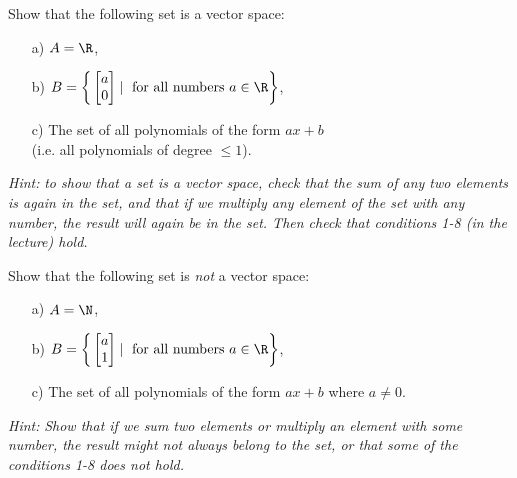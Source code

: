 \begin{problem}%
    Show that the following set is a vector space:

    \begin{enumerate}
        \item [a)] $A = \R$,
        
        \item [b)] $B = \bigg\{ \begin{bmatrix} a \\ 0 \end{bmatrix} \mid \text{ for all numbers }a\in\R\bigg\}$,

        \item [c)] The set of all polynomials of the form $ax+b$ \\(i.e. all polynomials of degree $\le 1$). 

    \end{enumerate}
    \bigskip
    {\small \textit{Hint:} \textit{to show that a set is a vector space, check that the sum of any two elements is again in the set, and that if we multiply any element of the set with any number, the result will again be in the set. Then check that conditions 1-8 (in the lecture) hold.}}
\end{problem}
\medskip
\begin{problem}%
    Show that the following set is \textit{not} a vector space:

    \begin{enumerate}
        \item [a)] $A = \N$,
        
        \item [b)] $B =  \bigg\{ \begin{bmatrix} a \\ 1 \end{bmatrix} \mid \text{ for all numbers }a\in\R\bigg\}$,
        
        \item [c)] The set of all polynomials of the form $ax+b$ where $a \ne 0$.

    \end{enumerate}
    \bigskip
    {\small \textit{Hint:} \textit{Show that if we sum two elements or multiply an element with some number, the result might not always belong to the set, or that some of the conditions 1-8 does not hold.}}
\end{problem}


        
        